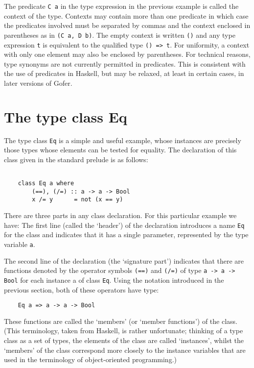 The predicate \verb"C a" in the type expression in  the  previous  example  is
called the context of the type.  Contexts may  contain  more  than  one
predicate in which case the predicates involved must  be  separated  by
commas and the context enclosed in parentheses as in \verb"(C a, D b)".   The
empty context is written \verb"()" and any type expression \verb"t" 
is equivalent  to
the qualified type \verb"() => t".  For uniformity, a context  with  only  one
element may also be enclosed by parentheses.
For technical reasons, type synonyms are  not  currently  permitted  in
predicates.  This is consistent with the use of predicates in  Haskell,
but may be relaxed, at least in certain cases,  in  later  versions  of
Gofer.


\section{The type class Eq}
The type class \verb"Eq" is a simple and useful example, whose  instances  are
precisely those types whose elements can be tested for  equality.   The
declaration of this class given in the standard prelude is as follows:
\begin{verbatim}

    class Eq a where
        (==), (/=) :: a -> a -> Bool
        x /= y      = not (x == y)
\end{verbatim}
There are three parts in any class declaration.   For  this  particular
example we have:
\BI
\IT  The first line (called the `header') of the declaration introduces
     a name \verb"Eq" for the  class  and  indicates  that  it  has  a  single
     parameter, represented by the type variable \verb"a".

\IT  The  second  line  of  the  declaration  (the  `signature   part')
     indicates that there are functions denoted by the operator symbols
     \verb"(==)" and \verb"(/=)" of type \verb"a -> a -> Bool" 
     for each instance a of  class
     \verb"Eq".  Using the notation introduced in the previous  section,  both
     of these operators have type:
\begin{verbatim}
    Eq a => a -> a -> Bool
\end{verbatim}
     These functions are called the `members' (or  `member  functions')
     of the class.  (This terminology, taken from  Haskell,  is  rather
     unfortunate; thinking of a type class  as  a  set  of  types,  the
     elements of the class are called `instances', whilst the `members'
     of the class correspond more closely  to  the  instance  variables
     that are used in the terminology of object-oriented programming.)

